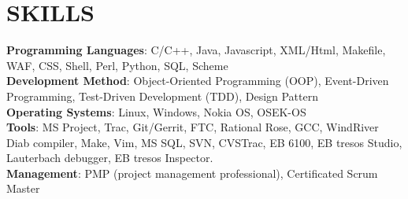 
\section{SKILLS}
\textbf{Programming Languages}: C/C++, Java, Javascript, XML/Html, Makefile, WAF, CSS, Shell, Perl, Python, SQL, Scheme\\
\textbf{Development Method}:
Object-Oriented Programming (OOP),
Event-Driven Programming,
Test-Driven Development (TDD),
Design Pattern\\
\textbf{Operating Systems}: Linux, Windows, Nokia OS, OSEK-OS\\
\textbf{Tools}:
MS Project, Trac, Git/Gerrit, FTC, Rational Rose,
GCC, WindRiver Diab compiler, Make,
Vim, MS SQL, SVN, CVSTrac,
EB 6100, EB tresos Studio, Lauterbach debugger, EB tresos Inspector. \\
\textbf{Management}: PMP (project management professional), Certificated Scrum Master

